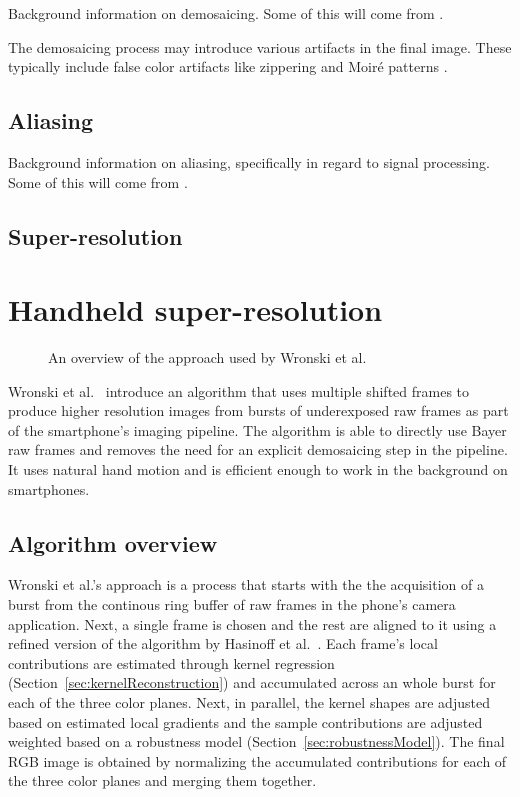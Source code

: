 \documentclass{sig-alternate}
\begin{document}
Background information on demosaicing. Some of this will come from \cite{wiki:Demosaicing}.

The demosaicing process may introduce various artifacts in the final image. These typically include false color artifacts like zippering and Moiré patterns \cite{Wronski2019}.

\subsection{Aliasing}

Background information on aliasing, specifically in regard to signal processing. Some of this will come from \cite{wiki:Aliasing}.

\subsection{Super-resolution}

\section{Handheld super-resolution}

\begin{figure*}[t!]
\centering
\caption{An overview of the approach used by Wronski et al. \cite{Wronski2019}}
\label{fig:Wronski2019Fig2}
\end{figure*}

Wronski et al.~\cite{Wronski2019} introduce an algorithm that uses multiple shifted frames to produce higher resolution images from bursts of underexposed raw frames as part of the smartphone's imaging pipeline. The algorithm is able to directly use Bayer raw frames and removes the need for an explicit demosaicing step in the pipeline. It uses natural hand motion and is efficient enough to work in the background on smartphones.

\subsection{Algorithm overview}

Wronski et al.'s approach is a process that starts with the the acquisition of a burst from the continous ring buffer of raw frames in the phone's camera application. Next, a single frame is chosen and the rest are aligned to it using a refined version of the algorithm by Hasinoff et al.~\cite{Hasinoff2016}.
Each frame's local contributions are estimated through kernel regression (Section~\ref{sec:kernelReconstruction}) and accumulated across an whole burst for each of the three color planes.
Next, in parallel, the kernel shapes are adjusted based on estimated local gradients and the sample contributions are adjusted weighted based on a robustness model (Section~\ref{sec:robustnessModel}).
The final RGB image is obtained by normalizing the accumulated contributions for each of the three color planes and merging them together.
\end{document}
